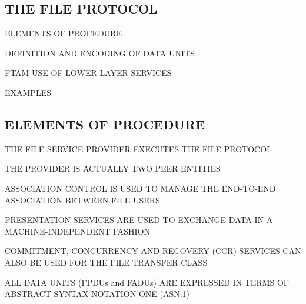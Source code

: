 
\begin{bwslide}
\part	{THE FILE PROTOCOL}

\begin{nrtc}\bf
\item	ELEMENTS OF PROCEDURE

\item	DEFINITION AND ENCODING OF DATA UNITS

\item	FTAM USE OF LOWER-LAYER SERVICES

\item	EXAMPLES
\end{nrtc}
\end{bwslide}


\begin{bwslide}
\part*	{ELEMENTS OF PROCEDURE}%

\begin{nrtc}
\item	THE FILE SERVICE PROVIDER EXECUTES THE FILE PROTOCOL

\item	THE PROVIDER IS ACTUALLY TWO PEER ENTITIES

\item	ASSOCIATION CONTROL IS USED TO MANAGE THE END-TO-END ASSOCIATION
	BETWEEN FILE USERS

\item	PRESENTATION SERVICES ARE USED TO EXCHANGE DATA IN A
	MACHINE-INDEPENDENT FASHION

\item	COMMITMENT, CONCURRENCY AND RECOVERY (CCR) SERVICES CAN ALSO BE USED
	FOR THE FILE TRANSFER CLASS

\item	ALL DATA UNITS (FPDUs and FADUs) ARE EXPRESSED IN TERMS OF
	ABSTRACT SYNTAX NOTATION ONE (ASN.1)
\end{nrtc}
\end{bwslide}


